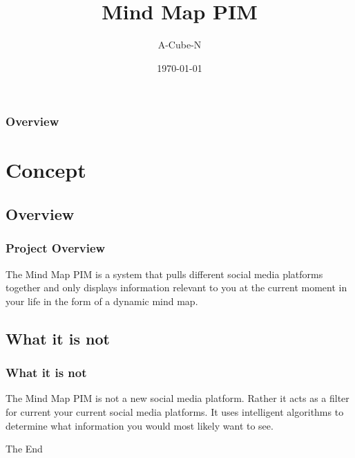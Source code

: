 \documentclass{beamer}
\title[Mind Map PIM]{Mind Map PIM}
\author{A-Cube-N}
\institute[UP]{
	Department of Computer Science, University of Pretoria
}
\date{\today}
\begin{document}
\begin{frame}
	\titlepage
\end{frame}

\begin{frame}
	\frametitle{Overview}
	\tableofcontents
\end{frame}

\section{Concept}
	\subsection{Overview}
		\begin{frame}
		\frametitle{Project Overview}
		The Mind Map PIM is a system that pulls different social media platforms together and only displays information relevant to you at the current moment in your life in the form of a dynamic mind map.
		\end{frame}
	
	\subsection{What it is not}
		\begin{frame}
		\frametitle{What it is not}
		The Mind Map PIM is not a new social media platform. Rather it acts as a filter for current your current social media platforms. It uses intelligent algorithms to determine what information you would most likely want to see.
		\end{frame}

\begin{frame}
	\Huge{\centerline{The End}}
\end{frame}
\end{document}
